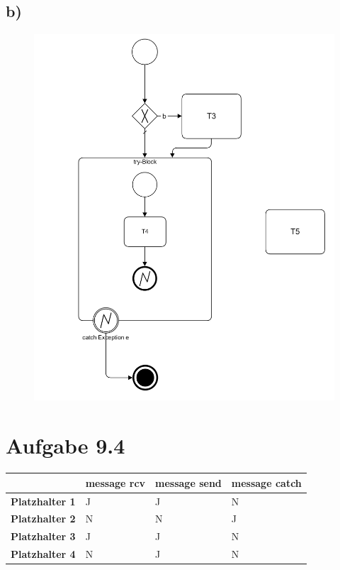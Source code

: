 \documentclass{article}
\begin{document}
		\subsection*{b)}
			\begin{figure}[h!]
				\includegraphics[scale=0.25]{aufgabe_9_3_b.jpg}
			\end{figure}
		
	\pagebreak
		
	\section*{Aufgabe 9.4}
		\begin{table}[h!]
			\begin{tabular}{l|l|l|l}
				& message rcv & message send & message catch \\ \hline
				\textbf{Platzhalter 1} &  J           &  J            &  N             \\ \hline
				\textbf{Platzhalter 2} &  N           &  N            &  J             \\ \hline
				\textbf{Platzhalter 3} &  J           &  J            &  N             \\ \hline
				\textbf{Platzhalter 4} &  N           &  J            &  N            
			\end{tabular}
		\end{table}
			
\end{document}
